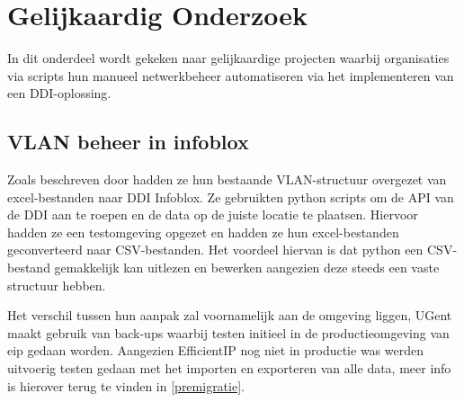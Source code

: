 \section{Gelijkaardig Onderzoek}
In dit onderdeel wordt gekeken naar gelijkaardige projecten waarbij organisaties via scripts hun manueel netwerkbeheer automatiseren via het implementeren van een DDI-oplossing.

\subsection{VLAN beheer in infoblox}
Zoals beschreven door \textcite{Karaoui2023} hadden ze hun bestaande VLAN-structuur overgezet van excel-bestanden naar DDI Infoblox. Ze gebruikten python scripts om de API van de DDI aan te roepen en de data op de juiste locatie te plaatsen. Hiervoor hadden ze een testomgeving opgezet en hadden ze hun excel-bestanden geconverteerd naar CSV-bestanden. Het voordeel hiervan is dat python een CSV-bestand gemakkelijk kan uitlezen en bewerken aangezien deze steeds een vaste structuur hebben.

Het verschil tussen hun aanpak zal voornamelijk aan de omgeving liggen, UGent maakt gebruik van back-ups waarbij testen initieel in de productieomgeving van \acrshort{eip} gedaan worden. Aangezien EfficientIP nog niet in productie was werden uitvoerig testen gedaan met het importen en exporteren van alle data, meer info is hierover terug te vinden in \ref{premigratie}.


